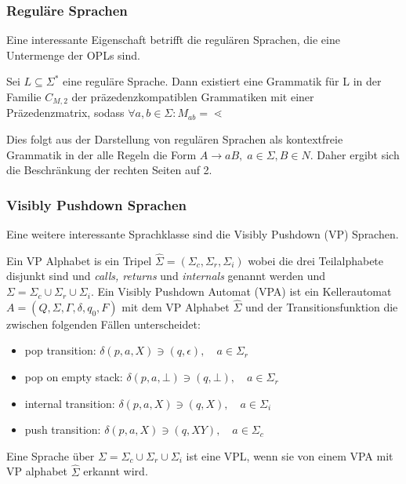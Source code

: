 \subsubsection{Reguläre Sprachen}
Eine interessante Eigenschaft betrifft die regulären Sprachen, die eine Untermenge der OPLs sind.
\begin{lemma}
Sei $L\subseteq\Sigma^*$ eine reguläre Sprache. Dann existiert eine Grammatik für L in der Familie $C_{M,2}$ der präzedenzkompatiblen Grammatiken mit einer Präzedenzmatrix, sodass $\forall a,b\in \Sigma: M_{ab}=\lessdot$
\end{lemma}
Dies folgt aus der Darstellung von regulären Sprachen als kontextfreie Grammatik in der alle Regeln die Form $A\rightarrow aB, \; a \in \Sigma, B \in N$. Daher ergibt sich die Beschränkung der rechten Seiten auf 2.

\subsubsection{Visibly Pushdown Sprachen}
Eine weitere interessante Sprachklasse sind die Visibly Pushdown (VP) Sprachen.
\begin{definition}
Ein VP Alphabet is ein Tripel $\hat{\Sigma}=(\Sigma_c, \Sigma_r, \Sigma_i)$ wobei die drei Teilalphabete disjunkt sind und \textit{calls, returns} und \textit{internals} genannt werden und $\Sigma=\Sigma_c \cup \Sigma_r \cup \Sigma_i$. Ein Visibly Pushdown Automat (VPA) ist ein Kellerautomat $A=(Q, \Sigma, \Gamma, \delta, q_0, F)$ mit dem VP Alphabet $\hat{\Sigma}$ und der Transitionsfunktion die zwischen folgenden Fällen unterscheidet:
\begin{itemize}
\item
pop transition: $\delta(p,a,X) \ni (q, \epsilon), \quad a \in \Sigma_r$
\item
pop on empty stack: $\delta(p, a, \bot) \ni (q, \bot), \quad a \in \Sigma_r$
\item
internal transition: $\delta(p,a,X) \ni (q, X), \quad a \in \Sigma_i$
\item
push transition: $\delta(p, a, X) \ni (q, XY), \quad a \in \Sigma_c$
\end{itemize}
\end{definition}
Eine Sprache über $\Sigma=\Sigma_c \cup \Sigma_r \cup \Sigma_i$ ist eine VPL, wenn sie von einem VPA mit VP alphabet $\hat{\Sigma}$ erkannt wird.

